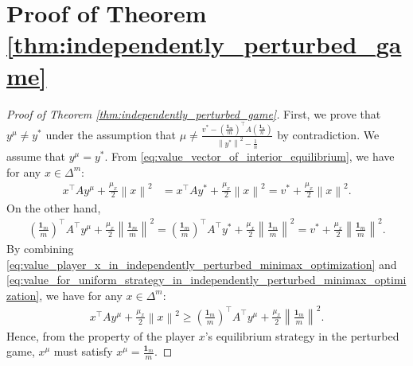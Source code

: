 \documentclass{article}
\newcommand{\bone}{\mathbf{1}}
\theoremstyle{plain}
\begin{document}
\section{Proof of Theorem \ref{thm:independently_perturbed_game}}
\begin{proof}[Proof of Theorem \ref{thm:independently_perturbed_game}]
    First, we prove that $y^{\mu}\neq y^{\ast}$ under the assumption that $\mu \neq \frac{v^{\ast} - \left(\frac{\bone_m}{m}\right)^{\top}A\left(\frac{\bone_n}{n}\right)}{\left\|y^{\ast}\right\|^2 - \frac{1}{n}}$ by contradiction.
    We assume that $y^{\mu} = y^{\ast}$.
    From \eqref{eq:value_vector_of_interior_equilibrium}, we have for any $x\in \Delta^m$:
    \begin{align}
        x^{\top}Ay^{\mu} + \frac{\mu_x}{2} \left\|x\right\|^2 & = x^{\top}Ay^{\ast} + \frac{\mu_x}{2} \left\|x\right\|^2 = v^{\ast} + \frac{\mu_x}{2} \left\|x\right\|^2.
        \label{eq:value_player_x_in_independently_perturbed_minimax_optimization}
    \end{align}
    On the other hand,
    \begin{align}
        \left(\frac{\bone_m}{m}\right)^{\top}A^{\top}y^{\mu} + \frac{\mu_x}{2} \left\|\frac{\bone_m}{m}\right\|^2 = \left(\frac{\bone_m}{m}\right)^{\top}A^{\top}y^{\ast} + \frac{\mu_x}{2} \left\|\frac{\bone_m}{m}\right\|^2 =  v^{\ast} + \frac{\mu_x}{2} \left\|\frac{\bone_m}{m}\right\|^2.
        \label{eq:value_for_uniform_strategy_in_independently_perturbed_minimax_optimization}
    \end{align}
    By combining \eqref{eq:value_player_x_in_independently_perturbed_minimax_optimization} and \eqref{eq:value_for_uniform_strategy_in_independently_perturbed_minimax_optimization}, we have for any $x\in \Delta^m$:
    \begin{align*}
        x^{\top}Ay^{\mu} + \frac{\mu_x}{2} \left\|x\right\|^2 \geq \left(\frac{\bone_m}{m}\right)^{\top}A^{\top}y^{\mu} + \frac{\mu_x}{2} \left\|\frac{\bone_m}{m}\right\|^2.
    \end{align*}
    Hence, from the property of the player $x$'s equilibrium strategy in the perturbed game, $x^{\mu}$ must satisfy $x^{\mu} = \frac{\bone_m}{m}$.


\end{proof}
\end{document}

